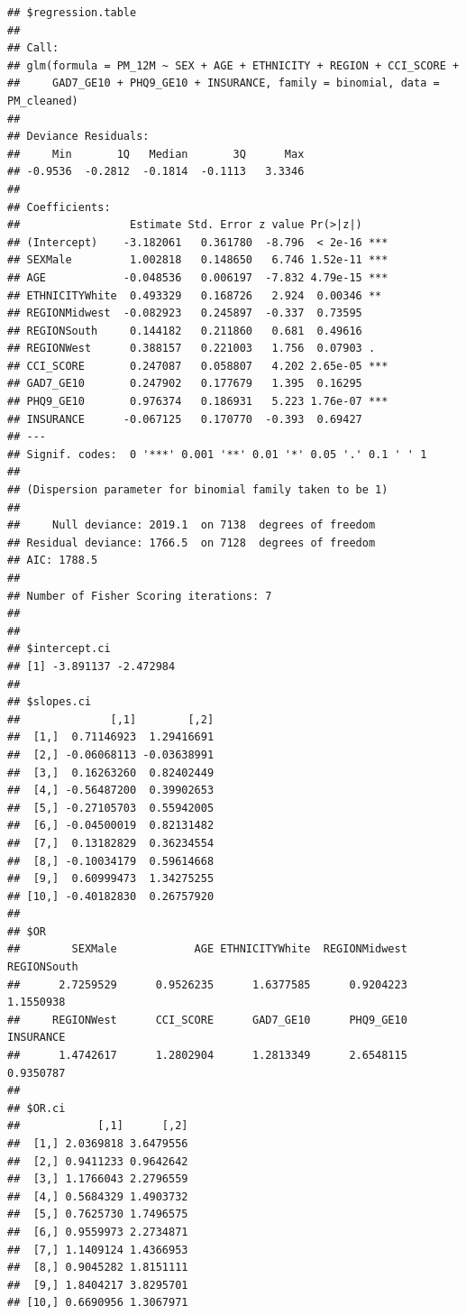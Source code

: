 \documentclass[
]{article}
\begin{document}
\begin{verbatim}
## $regression.table
## 
## Call:
## glm(formula = PM_12M ~ SEX + AGE + ETHNICITY + REGION + CCI_SCORE + 
##     GAD7_GE10 + PHQ9_GE10 + INSURANCE, family = binomial, data = PM_cleaned)
## 
## Deviance Residuals: 
##     Min       1Q   Median       3Q      Max  
## -0.9536  -0.2812  -0.1814  -0.1113   3.3346  
## 
## Coefficients:
##                 Estimate Std. Error z value Pr(>|z|)    
## (Intercept)    -3.182061   0.361780  -8.796  < 2e-16 ***
## SEXMale         1.002818   0.148650   6.746 1.52e-11 ***
## AGE            -0.048536   0.006197  -7.832 4.79e-15 ***
## ETHNICITYWhite  0.493329   0.168726   2.924  0.00346 ** 
## REGIONMidwest  -0.082923   0.245897  -0.337  0.73595    
## REGIONSouth     0.144182   0.211860   0.681  0.49616    
## REGIONWest      0.388157   0.221003   1.756  0.07903 .  
## CCI_SCORE       0.247087   0.058807   4.202 2.65e-05 ***
## GAD7_GE10       0.247902   0.177679   1.395  0.16295    
## PHQ9_GE10       0.976374   0.186931   5.223 1.76e-07 ***
## INSURANCE      -0.067125   0.170770  -0.393  0.69427    
## ---
## Signif. codes:  0 '***' 0.001 '**' 0.01 '*' 0.05 '.' 0.1 ' ' 1
## 
## (Dispersion parameter for binomial family taken to be 1)
## 
##     Null deviance: 2019.1  on 7138  degrees of freedom
## Residual deviance: 1766.5  on 7128  degrees of freedom
## AIC: 1788.5
## 
## Number of Fisher Scoring iterations: 7
## 
## 
## $intercept.ci
## [1] -3.891137 -2.472984
## 
## $slopes.ci
##              [,1]        [,2]
##  [1,]  0.71146923  1.29416691
##  [2,] -0.06068113 -0.03638991
##  [3,]  0.16263260  0.82402449
##  [4,] -0.56487200  0.39902653
##  [5,] -0.27105703  0.55942005
##  [6,] -0.04500019  0.82131482
##  [7,]  0.13182829  0.36234554
##  [8,] -0.10034179  0.59614668
##  [9,]  0.60999473  1.34275255
## [10,] -0.40182830  0.26757920
## 
## $OR
##        SEXMale            AGE ETHNICITYWhite  REGIONMidwest    REGIONSouth 
##      2.7259529      0.9526235      1.6377585      0.9204223      1.1550938 
##     REGIONWest      CCI_SCORE      GAD7_GE10      PHQ9_GE10      INSURANCE 
##      1.4742617      1.2802904      1.2813349      2.6548115      0.9350787 
## 
## $OR.ci
##            [,1]      [,2]
##  [1,] 2.0369818 3.6479556
##  [2,] 0.9411233 0.9642642
##  [3,] 1.1766043 2.2796559
##  [4,] 0.5684329 1.4903732
##  [5,] 0.7625730 1.7496575
##  [6,] 0.9559973 2.2734871
##  [7,] 1.1409124 1.4366953
##  [8,] 0.9045282 1.8151111
##  [9,] 1.8404217 3.8295701
## [10,] 0.6690956 1.3067971
\end{verbatim}
\end{document}
